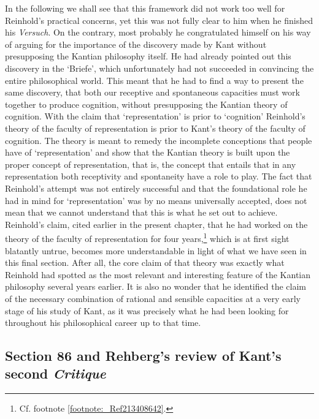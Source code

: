  In the following we shall see that this framework did not work too well for Reinhold's practical concerns, yet this was not fully clear to him when he finished his \textit{Versuch}. On the contrary, most probably he congratulated himself on his way of arguing for the importance of the discovery made by Kant without presupposing the Kantian philosophy itself. He had already pointed out this discovery in the `Briefe', which unfortunately had not succeeded in convincing the entire philosophical world. This meant that he had to find a way to present the same discovery, that both our receptive and spontaneous capacities must work together to produce cognition, without presupposing the Kantian theory of cognition. With the claim that `representation' is prior to `cognition' Reinhold's theory of the faculty of representation is prior to Kant's theory of the faculty of cognition. The theory is meant to remedy the incomplete conceptions that people have of `representation' and show that the Kantian theory is built upon the proper concept of representation, that is, the concept that entails that in any representation both receptivity and spontaneity have a role to play. The fact that Reinhold's attempt was not entirely successful and that the foundational role he had in mind for `representation' was by no means universally accepted, does not mean that we cannot understand that this is what he set out to achieve. Reinhold's claim, cited earlier in the present chapter, that he had worked on the theory of the faculty of representation for four years,\footnote{ Cf. footnote \ref{footnote:_Ref213408642}.} which is at first sight blatantly untrue, becomes more understandable in light of what we have seen in this final section. After all, the core claim of that theory was exactly what Reinhold had spotted as the most relevant and interesting feature of the Kantian philosophy several years earlier. It is also no wonder that he identified the claim of the necessary combination of rational and sensible capacities at a very early stage of his study of Kant, as it was precisely what he had been looking for throughout his philosophical career up to that time. 


\subsection{Section 86 and Rehberg's review of Kant's second \textit{Critique}}


